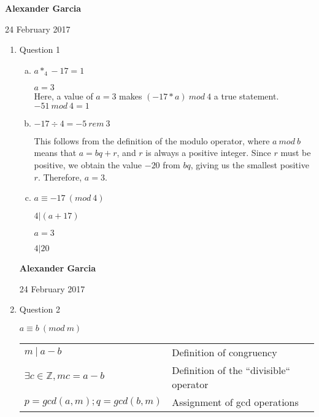 \documentclass[11pt]{article}
\begin{document}
\textbf{Alexander Garcia}

24 February 2017 \\

\begin{enumerate}

	\item Question 1

		\begin{enumerate}[(a)]

			\item $a *_4 -17 = 1$

			$a = 3$\\

			Here, a value of $a=3$ makes $(-17 * a)\ mod\ 4$ a true statement. $-51\ mod\ 4 = 1$ \\


			\item $-17 \div 4 = -5\ rem\ 3$

			This follows from the definition of the modulo operator, where $a\ mod\ b$
			means that $a = bq + r$, and $r$ is always a positive integer. Since $r$ must
			be positive, we obtain the value $-20$ from $bq$, giving us the smallest positive $r$.
			Therefore, $a = 3$. \\

			\item $a \equiv -17\ (mod\ 4)$

			$4 | (a+17)$

			$a = 3$

			$4 | 20$ \\

		\end{enumerate}

	\newpage

	\textbf{Alexander Garcia}

	24 February 2017 \\

	\item Question 2

		$a \equiv b\ (mod\ m)$

		\begin{tabular}{ll}
			$m\ |\ a-b$ & Definition of congruency \\

			$\exists c \in \mathbb{Z}, mc = a-b$ & Definition of the ``divisible`` operator \\

			$p = gcd(a,m); q = gcd(b,m)$ & Assignment of gcd operations \\


\end{tabular}
\end{enumerate}
\end{document}
